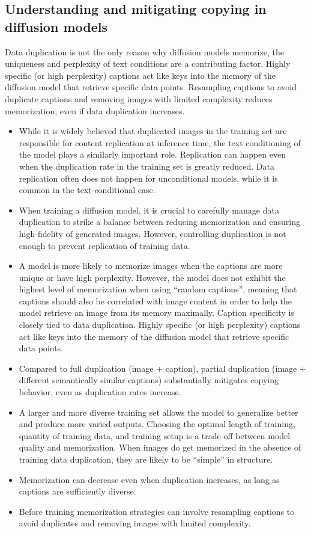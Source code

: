 \documentclass{article}
\begin{document}
\subsection{Understanding and mitigating copying in diffusion models}
\begin{tldr}
Data duplication is not the only reason why diffusion models memorize, the uniqueness and perplexity of text conditions are a contributing factor. Highly specific (or high perplexity) captions act like keys into the memory of the diffusion model that retrieve specific data points. Resampling captions to avoid duplicate captions and removing images with limited complexity reduces memorization, even if data duplication increases.
\end{tldr}
\begin{itemize}
    \item While it is widely believed that duplicated images in the training set are responsible for content replication at inference time, the text conditioning of the model plays a similarly important role. Replication can happen even when the duplication rate in the training set is greatly reduced. Data replication often does not happen for unconditional models, while it is common in the text-conditional case.
    \item When training a diffusion model, it is crucial to carefully manage data duplication to strike a balance between reducing memorization and ensuring high-fidelity of generated images. However, controlling duplication is not enough to prevent replication of training data.
    \item A model is more likely to memorize images when the captions are more unique or have high perplexity. However, the model does not exhibit the highest level of memorization when using “random captions”, meaning that captions should also be correlated with image content in order to help the model retrieve an image from its memory maximally. Caption specificity is closely tied to data duplication. Highly specific (or high perplexity) captions act like keys into the memory of the diffusion model that retrieve specific data points.
    \item Compared to full duplication (image + caption), partial duplication (image + different semantically similar captions) substantially mitigates copying behavior, even as duplication rates increase.
    \item A larger and more diverse training set allows the model to generalize better and produce more varied outputs. Choosing the optimal length of training, quantity of training data, and training setup is a trade-off between model quality and memorization. When images do get memorized in the absence of training data duplication, they are likely to be “simple” in structure.
    \item Memorization can decrease even when duplication increases, as long as captions are sufficiently diverse.
    \item Before training memorization strategies can involve resampling captions to avoid duplicates and removing images with limited complexity.
\end{itemize}
\end{document}
